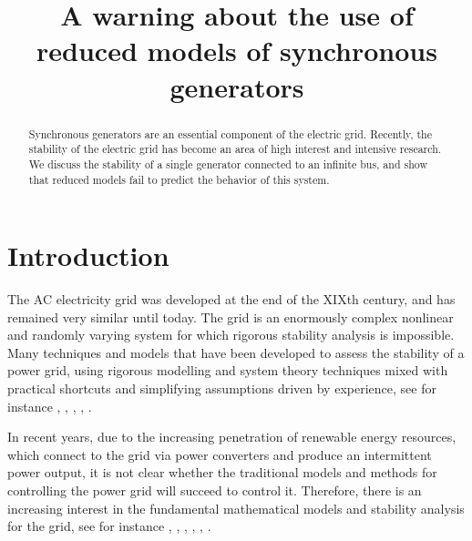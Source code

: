 \documentclass[conference]{IEEEtran}
\begin{document}
\title{A warning about the use of reduced models of synchronous 
       generators }
\author{  \and 
    }

\maketitle

\begin{abstract}
Synchronous generators are an essential component of the electric
grid. Recently, the stability of the electric grid has become an area
of high interest and intensive research. We discuss the stability of a
single generator connected to an infinite bus, and show that reduced
models fail to predict the behavior of this system.
\end{abstract}

\section{Introduction}

The AC electricity grid was developed at the end of the XIXth century,
and has remained very similar until today. The grid is an enormously
complex nonlinear and randomly varying system for which rigorous
stability analysis is impossible. Many techniques and models that have
been developed to assess the stability of a power grid, using rigorous
modelling and system theory techniques mixed with practical shortcuts
and simplifying assumptions driven by experience, see for instance
\cite{Kundur}, \cite{GrSt2014}, \cite{SauerPai1998}, \cite{GOBS:03},
\cite{DoBull:12}.

In recent years, due to the increasing penetration of renewable energy
resources, which connect to the grid via power converters and produce
an intermittent power output, it is not clear whether the traditional
models and methods for controlling the power grid will succeed to
control it. Therefore, there is an increasing interest in the
fundamental mathematical models and stability analysis for the grid,
see for instance \cite{DoBull:12}, \cite{PoDoBu:13}, \cite{CaTa:14},
\cite{NaWe:14}, \cite{NaWe:15}, \cite{DePersiSchaft:16}.
\end{document}
